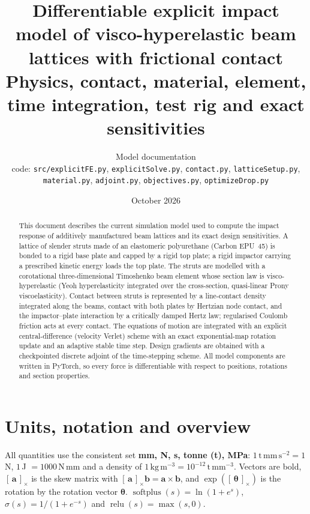 \documentclass[11pt,a4paper]{article}
\title{Differentiable explicit impact model of visco-hyperelastic beam lattices with frictional contact\\[4pt]
\large Physics, contact, material, element, time integration, test rig and exact sensitivities}
\author{Model documentation\\[2pt]\small code: \texttt{src/explicitFE.py}, \texttt{explicitSolve.py}, \texttt{contact.py}, \texttt{latticeSetup.py},\\
\small \texttt{material.py}, \texttt{adjoint.py}, \texttt{objectives.py}, \texttt{optimizeDrop.py}}
\date{October 2026}
\newcommand{\vect}[1]{\bm{#1}}
\newcommand{\skw}[1]{[\,#1\,]_{\times}}
\newcommand{\softplus}{\operatorname{softplus}}
\newcommand{\relu}{\operatorname{relu}}
\begin{document}
\maketitle

\begin{abstract}
This document describes the current simulation model used to compute the impact response of additively
manufactured beam lattices and its exact design sensitivities. A lattice of slender struts made of an
elastomeric polyurethane (Carbon EPU~45) is bonded to a rigid base plate and capped by a rigid top plate; a
rigid impactor carrying a prescribed kinetic energy loads the top plate. The struts are modelled with a
corotational three-dimensional Timoshenko beam element whose section law is visco-hyperelastic (Yeoh
hyperelasticity integrated over the cross-section, quasi-linear Prony viscoelasticity). Contact between struts
is represented by a line-contact density integrated along the beams, contact with both plates by Hertzian node
contact, and the impactor--plate interaction by a critically damped Hertz law; regularised Coulomb friction acts
at every contact. The equations of motion are integrated with an explicit central-difference (velocity Verlet)
scheme with an exact exponential-map rotation update and an adaptive stable time step. Design gradients are
obtained with a checkpointed discrete adjoint of the time-stepping scheme. All model components are written in
PyTorch, so every force is differentiable with respect to positions, rotations and section properties.
\end{abstract}

\tableofcontents
\newpage

\section{Units, notation and overview}
\label{sec:units}
All quantities use the consistent set \textbf{mm, N, s, tonne (t), MPa}: $1\,\mathrm{t\,mm\,s^{-2}} = 1$\,N,
$1$\,J $=1000$\,N\,mm and a density of $1\,\mathrm{kg\,m^{-3}} = 10^{-12}\,\mathrm{t\,mm^{-3}}$.
Vectors are bold, $\skw{\vect{a}}$ is the skew matrix with $\skw{\vect{a}}\vect{b} = \vect{a}\times\vect{b}$,
and $\exp(\skw{\vect{\theta}})$ is the rotation by the rotation vector $\vect{\theta}$.
$\softplus(s)=\ln(1+e^{s})$, $\sigma(s) = 1/(1+e^{-s})$ and $\relu(s)=\max(s,0)$.
\end{document}
